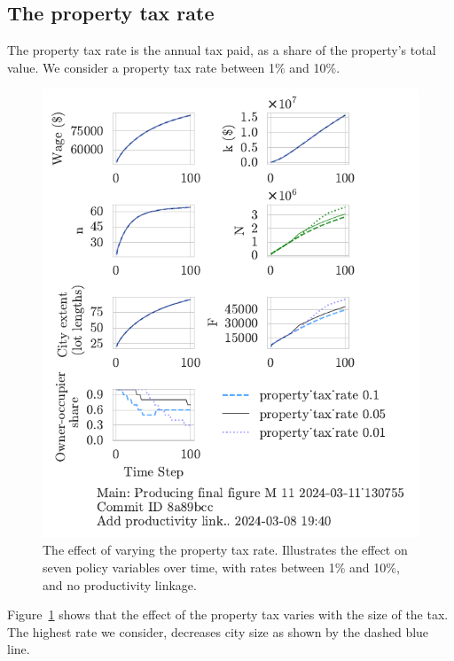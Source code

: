 \newpage



\subsection{The property tax rate}

The property tax rate is the annual tax paid, as a share of the property's total value. We consider a property tax rate between 1\% and 10\%.
\begin{figure}[h!b]
\centering
\includegraphics[scale=0.9, trim={0 1.4cm 0 0},clip]{fig/property_tax_rate-Main-130755.pdf}
\caption[The effect of varying the property tax rate]{The effect of varying the property tax rate. Illustrates the effect on seven policy variables over time, with rates between 1\% and 10\%, and no productivity linkage.}
\label{fig:property_tax_ownership_trajectory}
\end{figure}
Figure~\ref{fig:property_tax_ownership_trajectory} shows that the effect of the property tax varies with the size of the tax. The highest rate we consider, decreases city size as shown by the dashed blue line. %
